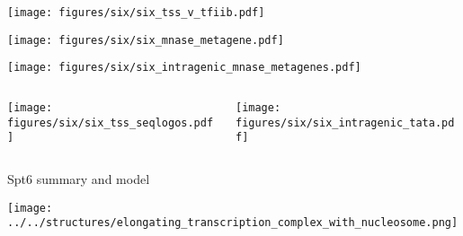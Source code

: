 \documentclass[aspectratio=169]{beamer}
\begin{document}
\begin{frame}
    \texttt{[image: figures/six/six\_tss\_v\_tfiib.pdf]}
\end{frame}

\begin{frame}
    \texttt{[image: figures/six/six\_mnase\_metagene.pdf]}
\end{frame}

\begin{frame}
    \texttt{[image: figures/six/six\_intragenic\_mnase\_metagenes.pdf]}
\end{frame}

\begin{frame}
    \centering
    \begin{columns}
        \begin{column}{0.5\textwidth}
            \texttt{[image: figures/six/six\_tss\_seqlogos.pdf]}
        \end{column}
        \begin{column}{0.5\textwidth}
            \texttt{[image: figures/six/six\_intragenic\_tata.pdf]}
        \end{column}
    \end{columns}
\end{frame}

\begin{frame}{Spt6 summary and model}
\end{frame}

\begin{frame}[t,plain]
    \centerline{\texttt{[image: ../../structures/elongating\_transcription\_complex\_with\_nucleosome.png]}}
\end{frame}
\end{document}
